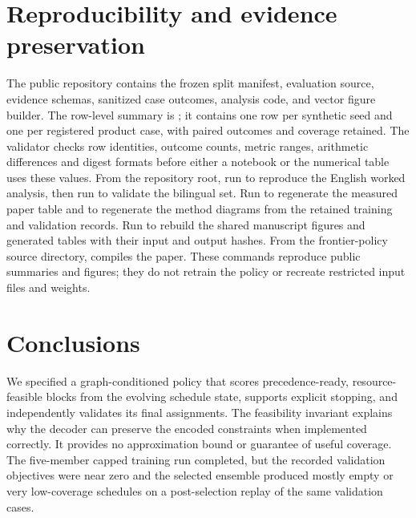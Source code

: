 \documentclass[11pt]{article}
\begin{document}
\section{Reproducibility and evidence preservation}
The public repository contains the frozen split manifest, evaluation source, evidence schemas, sanitized case outcomes, analysis code, and vector figure builder. The row-level summary is ; it contains one row per synthetic seed and one per registered product case, with paired outcomes and coverage retained. The validator checks row identities, outcome counts, metric ranges, arithmetic differences and digest formats before either a notebook or the numerical table uses these values. From the repository root, run  to reproduce the English worked analysis, then run  to validate the bilingual set. Run  to regenerate the measured paper table and  to regenerate the method diagrams from the retained training and validation records. Run  to rebuild the shared manuscript figures and generated tables with their input and output hashes. From the frontier-policy source directory,  compiles the paper. These commands reproduce public summaries and figures; they do not retrain the policy or recreate restricted input files and weights.

\section{Conclusions}
We specified a graph-conditioned policy that scores precedence-ready, resource-feasible blocks from the evolving schedule state, supports explicit stopping, and independently validates its final assignments. The feasibility invariant explains why the decoder can preserve the encoded constraints when implemented correctly. It provides no approximation bound or guarantee of useful coverage. The five-member capped training run completed, but the recorded validation objectives were near zero and the selected ensemble produced mostly empty or very low-coverage schedules on a post-selection replay of the same validation cases.
\end{document}
